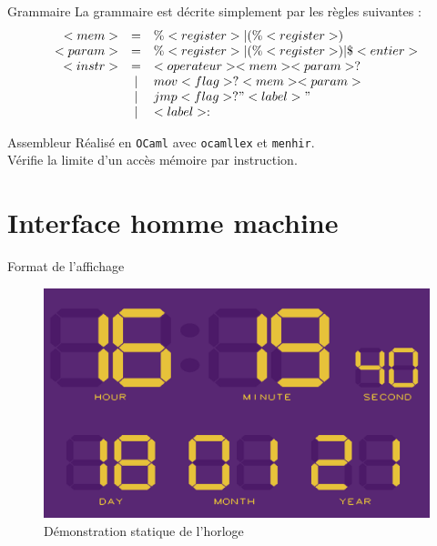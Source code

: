 \documentclass[intlimits, 10pt]{beamer}
\begin{document}
	\begin{frame}{Grammaire}
		La grammaire est décrite simplement par les règles suivantes :
	$$\begin{array}{rcl}
		<mem> & = & \%<register> | (\%<register>) \\
		<param> & = &  \%<register> | (\%<register>) | \$<entier>\\
		<instr> & = & <operateur> <mem> <param>? \\
		& | & mov <flag>? <mem> <param> \\
		& | & jmp <flag>? "<label>" \\
		& | & <label> : \\ 
	\end{array}$$
	\end{frame}
	
	\begin{frame}{Assembleur}
		Réalisé en \texttt{OCaml} avec \texttt{ocamllex} et \texttt{menhir}.\\
		Vérifie la limite d'un accès mémoire par instruction.
	\end{frame}

	
	\section{Interface homme machine}
	
	\begin{frame}{Format de l'affichage}
		\begin{figure}
			\centering
			\includegraphics[width=0.7\linewidth]{../Rapport/2021-01-18_16-19}
			\caption{Démonstration statique de l'horloge}
			\label{fig:2021-01-1816-19}
		\end{figure}
		
	\end{frame}
	
\end{document}
